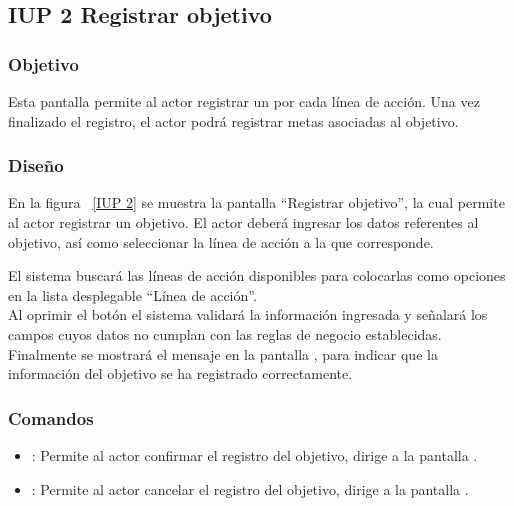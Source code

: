 \subsection{IUP 2 Registrar objetivo}
                     
\subsubsection{Objetivo}

   Esta pantalla permite al actor registrar un  por cada línea de acción. Una vez finalizado el registro, el actor podrá registrar metas asociadas al objetivo. 

	
\subsubsection{Diseño}

  En la figura ~\ref{IUP 2} se muestra la pantalla ``Registrar objetivo'',
  la cual permite al actor registrar un objetivo. 
  El actor deberá ingresar los datos referentes al objetivo, así como seleccionar la línea de acción a la que corresponde.\\
 
  
  El sistema buscará las líneas de acción disponibles para colocarlas como opciones en la lista desplegable ``Línea de acción''.\\
  
  Al oprimir el botón  el sistema validará la información ingresada y señalará los campos cuyos datos no cumplan con las reglas de negocio establecidas.\\
  
  Finalmente se mostrará el mensaje  en la pantalla , para indicar que la información del
  objetivo se ha registrado correctamente.
    
\subsubsection{Comandos}
\begin{itemize}
	\item {}: Permite al actor confirmar el registro del objetivo, dirige a la pantalla .
	\item {}: Permite al actor cancelar el registro del objetivo, dirige a la pantalla .
\end{itemize}


